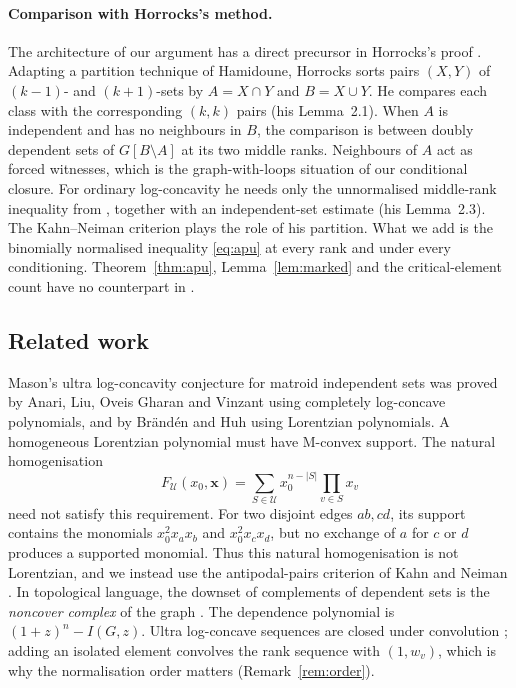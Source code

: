 \documentclass[11pt,a4paper]{article}
\theoremstyle{remark}
\newcommand{\U}{\mathcal U}
\begin{document}
\paragraph{Comparison with Horrocks's method.} The architecture of our argument has a direct precursor in Horrocks's proof \cite{H02}. Adapting a partition technique of Hamidoune, Horrocks sorts pairs $(X,Y)$ of $(k-1)$- and $(k+1)$-sets by $A=X\cap Y$ and $B=X\cup Y$. He compares each class with the corresponding $(k,k)$ pairs (his Lemma~2.1). When $A$ is independent and has no neighbours in $B$, the comparison is between doubly dependent sets of $G[B\setminus A]$ at its two middle ranks. Neighbours of $A$ act as forced witnesses, which is the graph-with-loops situation of our conditional closure. For ordinary log-concavity he needs only the unnormalised middle-rank inequality from \cite{H00}, together with an independent-set estimate (his Lemma~2.3). The Kahn--Neiman criterion plays the role of his partition. What we add is the binomially normalised inequality \eqref{eq:apu} at every rank and under every conditioning. Theorem~\ref{thm:apu}, Lemma~\ref{lem:marked} and the critical-element count have no counterpart in \cite{H02}.

\subsection{Related work}\label{sec:related}
Mason's ultra log-concavity conjecture for matroid independent sets was proved by Anari, Liu, Oveis Gharan and Vinzant \cite{ALOV} using completely log-concave polynomials, and by Br\"and\'en and Huh \cite{BH} using Lorentzian polynomials. A homogeneous Lorentzian polynomial must have M-convex support. The natural homogenisation
\[
F_{\U}(x_0,\boldsymbol x)=\sum_{S\in\U}x_0^{n-|S|}\prod_{v\in S}x_v
\]
need not satisfy this requirement. For two disjoint edges $ab,cd$, its support contains the monomials $x_0^2x_ax_b$ and $x_0^2x_cx_d$, but no exchange of $a$ for $c$ or $d$ produces a supported monomial. Thus this natural homogenisation is not Lorentzian, and we instead use the antipodal-pairs criterion of Kahn and Neiman \cite{KN}. In topological language, the downset of complements of dependent sets is the \emph{noncover complex} of the graph \cite{KK}. The dependence polynomial is $(1+z)^n-I(G,z)$. Ultra log-concave sequences are closed under convolution \cite{Liggett}; adding an isolated element convolves the rank sequence with $(1,w_v)$, which is why the normalisation order matters (Remark~\ref{rem:order}).
\end{document}
